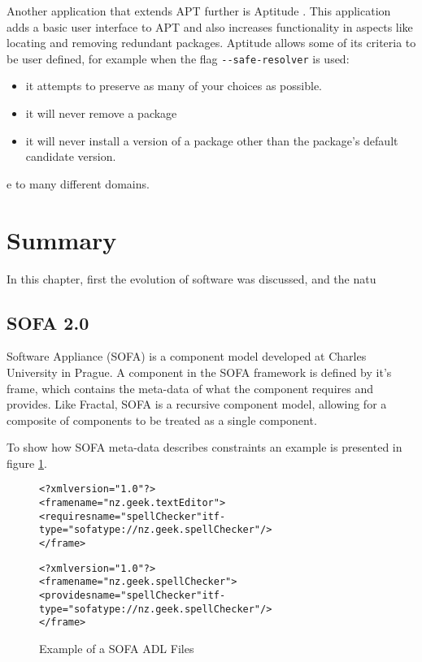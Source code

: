 Another application that extends APT further is Aptitude \citep{Burrows2005}.
This application adds a basic user interface to APT and also increases functionality in aspects like locating and removing redundant packages.
Aptitude allows some of its criteria to be user defined, for example when the flag \verb+--safe-resolver+ is used:
\begin{itemize}
  \item it attempts to preserve as many of your choices as possible.
  \item it will never remove a package
  \item it will never install a version of a package other than the package's default candidate version.
\end{itemize}e to many different domains. 

\section{Summary}
In this chapter, first the evolution of software was discussed, and the natu

\subsection{SOFA 2.0}
Software Appliance (SOFA) is a component model developed at Charles University in Prague.
A component in the SOFA framework is defined by it's frame, which contains the meta-data of what the component requires and provides.
Like Fractal, SOFA is a recursive component model, allowing for a composite of components to be treated as a single component.

To show how SOFA meta-data describes constraints an example is presented in figure \ref{SOFAmetadata}.

\begin{figure}[htp] 
\begin{center}
\begin{alltt}
<?xml version="1.0"?>
<frame name="nz.geek.textEditor">
  <requires name="spellChecker" itf-type="sofatype://nz.geek.spellChecker"/>
</frame>

<?xml version="1.0"?>
<frame name="nz.geek.spellChecker">
  <provides name="spellChecker" itf-type="sofatype://nz.geek.spellChecker"/>
</frame>
\end{alltt}
  \caption[SOFA ADL files]{Example of a SOFA ADL Files}
  \label{SOFAmetadata}
\end{center}
\end{figure}

